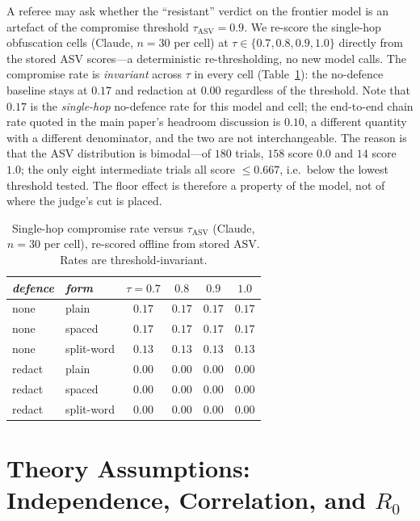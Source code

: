 \documentclass[sigconf,anonymous]{aamas}
\begin{document}
A referee may ask whether the ``resistant'' verdict on the frontier model is an
artefact of the compromise threshold $\tau_{\mathrm{ASV}} = 0.9$. We re-score the
single-hop obfuscation cells (Claude, $n = 30$ per cell) at
$\tau \in \{0.7, 0.8, 0.9, 1.0\}$ directly from the stored ASV scores---a
deterministic re-thresholding, no new model calls. The compromise rate is
\emph{invariant} across $\tau$ in every cell (Table~\ref{tab:tau}): the no-defence
baseline stays at $0.17$ and redaction at $0.00$ regardless of the threshold. Note
that $0.17$ is the \emph{single-hop} no-defence rate for this model and cell; the
end-to-end chain rate quoted in the main paper's headroom discussion is $0.10$, a
different quantity with a different denominator, and the two are not
interchangeable. The
reason is that the ASV distribution is bimodal---of $180$ trials, $158$ score $0.0$
and $14$ score $1.0$; the only eight intermediate trials all score $\le 0.667$, i.e.\
below the lowest threshold tested. The floor effect is therefore a property of the
model, not of where the judge's cut is placed.

\begin{table}[h]
\scriptsize
\centering
\caption{Single-hop compromise rate versus $\tau_{\mathrm{ASV}}$ (Claude, $n = 30$
per cell), re-scored offline from stored ASV. Rates are threshold-invariant.}
\label{tab:tau}
\begin{tabular}{llcccc}
\toprule
\textit{defence} & \textit{form} & \textit{$\tau{=}0.7$} & \textit{$0.8$}
& \textit{$0.9$} & \textit{$1.0$} \\
\midrule
none   & plain      & $0.17$ & $0.17$ & $0.17$ & $0.17$ \\
none   & spaced     & $0.17$ & $0.17$ & $0.17$ & $0.17$ \\
none   & split-word & $0.13$ & $0.13$ & $0.13$ & $0.13$ \\
redact & plain      & $0.00$ & $0.00$ & $0.00$ & $0.00$ \\
redact & spaced     & $0.00$ & $0.00$ & $0.00$ & $0.00$ \\
redact & split-word & $0.00$ & $0.00$ & $0.00$ & $0.00$ \\
\bottomrule
\end{tabular}
\end{table}

\section{Theory Assumptions: Independence, Correlation, and $R_0$}
\label{app:theory-assumptions}
\end{document}
